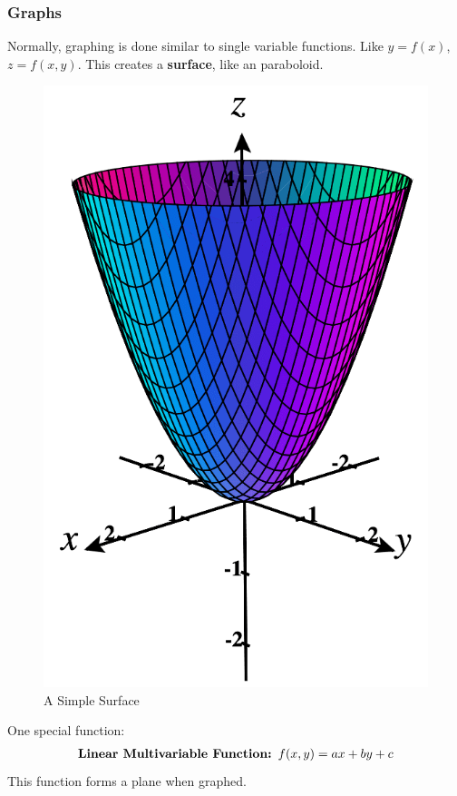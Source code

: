 \documentclass{article}
\begin{document}
\subsubsection{Graphs}
Normally, graphing is done similar to single variable functions. Like $y = f(x)$, $z = f(x,y)$. This creates a \textbf{surface}, like an paraboloid.
\begin{figure}[H]
\begin{center}
\includegraphics[scale=0.2]{Graphingf.png}
\caption{A Simple Surface}
\label{surface}
\end{center}
\end{figure}
One special function:
\begin{gather*}
    \textrm{\textbf{Linear Multivariable Function: }} f(x,y) = ax + by + c
\end{gather*}
This function forms a plane when graphed.
\end{document}
